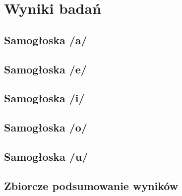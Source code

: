 \chapter{Wyniki badań}

\section{Samogłoska /a/}
\label{sec:samogloska-a}


\section{Samogłoska /e/}
\label{sec:samogloska-e}


\section{Samogłoska /i/}
\label{sec:samogloska-i}


\section{Samogłoska /o/}
\label{sec:samogloska-o}


\section{Samogłoska /u/}
\label{sec:samogloska-u}


\section{Zbiorcze podsumowanie wyników}
\label{sec:podsumowanie-wynikow}